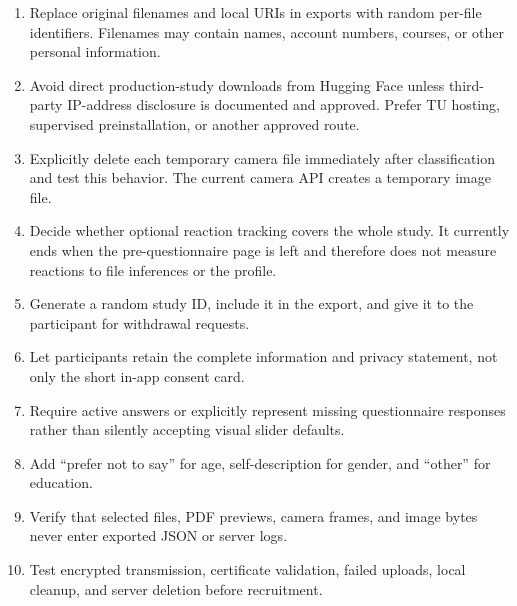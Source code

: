 \documentclass[10pt]{article}
\begin{document}
\begin{enumerate}
  \item Replace original filenames and local URIs in exports with random per-file identifiers. Filenames may contain names, account numbers, courses, or other personal information.
  \item Avoid direct production-study downloads from Hugging Face unless third-party IP-address disclosure is documented and approved. Prefer TU hosting, supervised preinstallation, or another approved route.
  \item Explicitly delete each temporary camera file immediately after classification and test this behavior. The current camera API creates a temporary image file.
  \item Decide whether optional reaction tracking covers the whole study. It currently ends when the pre-questionnaire page is left and therefore does not measure reactions to file inferences or the profile.
  \item Generate a random study ID, include it in the export, and give it to the participant for withdrawal requests.
  \item Let participants retain the complete information and privacy statement, not only the short in-app consent card.
  \item Require active answers or explicitly represent missing questionnaire responses rather than silently accepting visual slider defaults.
  \item Add ``prefer not to say'' for age, self-description for gender, and ``other'' for education.
  \item Verify that selected files, PDF previews, camera frames, and image bytes never enter exported JSON or server logs.
  \item Test encrypted transmission, certificate validation, failed uploads, local cleanup, and server deletion before recruitment.
\end{enumerate}
\end{document}

